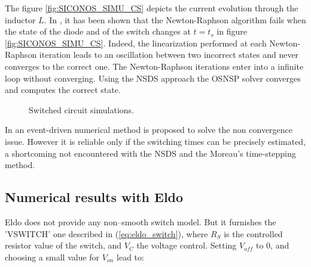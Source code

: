 The figure \ref{fig:SICONOS_SIMU_CS} depicts the current evolution through the inductor $L$. In \cite{maffezzoni2006}, it has been shown that the Newton-Raphson algorithm fails when the state of the diode and of the switch changes at $t=t_s$ in figure \ref{fig:SICONOS_SIMU_CS}. Indeed, the linearization performed at each Newton-Raphson iteration leads to an oscillation between two incorrect states and never converges to the correct one. The Newton-Raphson iterations enter into a infinite loop without converging.  Using the NSDS approach the OSNSP solver converges and computes the correct state. 


\begin{figure}[!ht]
  \hspace{-2mm}
 \caption{Switched circuit simulations.}
\label{figSimuCS}
\end{figure}


\begin{remark}
In \cite{maffezzoni2006} an event-driven numerical method is proposed to solve the non convergence issue. However it is reliable only if the switching times can be precisely estimated, a shortcoming not encountered  with the NSDS and the  Moreau's time-stepping method. 
\end{remark}

\subsection{Numerical results with {\sc Eldo}}
{\sc Eldo} does not provide any non--smooth switch model. But it furnishes the 'VSWITCH' one described in
(\ref{eq:eldo_switch}), where  $R_S$ is the controlled resistor value of the switch, and $V_{C}$ the voltage
control. Setting $V_{off}$ to $0$, and choosing a small value for $V_{on}$ lead to:


